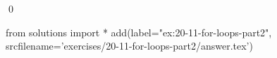 
\begin{ex}
  \label{ex:20-11-for-loops-part2}
  
  \qed
\end{ex}
\begin{python0}
from solutions import *
add(label="ex:20-11-for-loops-part2",
    srcfilename='exercises/20-11-for-loops-part2/answer.tex')
\end{python0}
